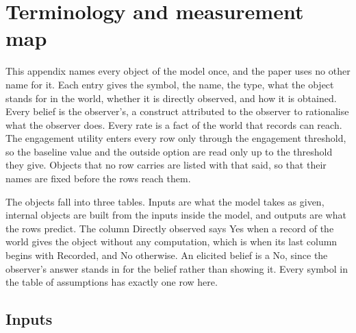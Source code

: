 \section{Terminology and measurement map}
\label{app:terms}

This appendix names every object of the model once, and the paper uses no
other name for it. Each entry gives the symbol, the name, the type, what the
object stands for in the world, whether it is directly observed, and how it
is obtained. Every belief is the observer's, a construct attributed to the
observer to rationalise what the observer does. Every rate is a fact of the
world that records can reach. The engagement utility enters every row only
through the engagement threshold, so the baseline value and the outside
option are read only up to the threshold they give. Objects that no row
carries are listed with that said, so that their names are fixed before the
rows reach them.

The objects fall into three tables. Inputs are what the model takes as given,
internal objects are built from the inputs inside the model, and outputs are
what the rows predict. The column Directly observed says Yes when a record of
the world gives the object without any computation, which is when its last
column begins with Recorded, and No otherwise. An elicited belief is a No,
since the observer's answer stands in for the belief rather than showing it.
Every symbol in the table of assumptions has exactly one row here.

\subsection{Inputs}

